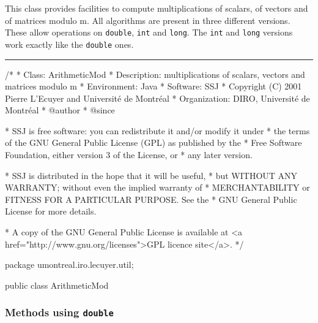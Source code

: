 
This class provides facilities to compute multiplications of scalars, of
vectors and of matrices modulo m. All algorithms are present in three 
different versions. These allow operations on \texttt{double}, \texttt{int} and
\texttt{long}. The \texttt{int} and \texttt{long} versions work exactly like the 
\texttt{double} ones.

\bigskip\hrule

\begin{code}\begin{hide}
/*
 * Class:        ArithmeticMod
 * Description:  multiplications of scalars, vectors and matrices modulo m
 * Environment:  Java
 * Software:     SSJ 
 * Copyright (C) 2001  Pierre L'Ecuyer and Université de Montréal
 * Organization: DIRO, Université de Montréal
 * @author       
 * @since

 * SSJ is free software: you can redistribute it and/or modify it under
 * the terms of the GNU General Public License (GPL) as published by the
 * Free Software Foundation, either version 3 of the License, or
 * any later version.

 * SSJ is distributed in the hope that it will be useful,
 * but WITHOUT ANY WARRANTY; without even the implied warranty of
 * MERCHANTABILITY or FITNESS FOR A PARTICULAR PURPOSE.  See the
 * GNU General Public License for more details.

 * A copy of the GNU General Public License is available at
   <a href="http://www.gnu.org/licenses">GPL licence site</a>.
 */
\end{hide}
package umontreal.iro.lecuyer.util;


public class ArithmeticMod \begin{hide} {

   //private constants
   private static final double two17    =  131072.0;
   private static final double two53    =  9007199254740992.0;

   //prevent the creation of the object
   private ArithmeticMod() {};

 \end{hide}
\end{code}

\subsubsection* {Methods using \texttt{double}}

